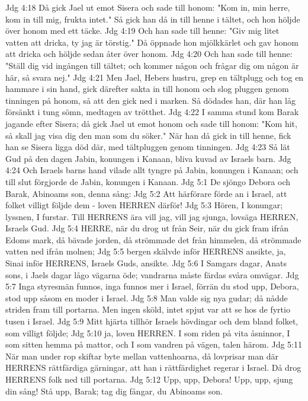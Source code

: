 Jdg 4:18  Då gick Jael ut emot Sisera och sade till honom: "Kom in, min herre, kom in till mig, frukta intet." Så gick han då in till henne i tältet, och hon höljde över honom med ett täcke.
Jdg 4:19  Och han sade till henne: "Giv mig litet vatten att dricka, ty jag är törstig." Då öppnade hon mjölkkärlet och gav honom att dricka och höljde sedan åter över honom.
Jdg 4:20  Och han sade till henne: "Ställ dig vid ingången till tältet; och kommer någon och frågar dig om någon är här, så svara nej."
Jdg 4:21  Men Jael, Hebers hustru, grep en tältplugg och tog en hammare i sin hand, gick därefter sakta in till honom och slog pluggen genom tinningen på honom, så att den gick ned i marken. Så dödades han, där han låg försänkt i tung sömn, medtagen av trötthet.
Jdg 4:22  I samma stund kom Barak jagande efter Sisera; då gick Jael ut emot honom och sade till honom: "Kom hit, så skall jag visa dig den man som du söker." När han då gick in till henne, fick han se Sisera ligga död där, med tältpluggen genom tinningen.
Jdg 4:23  Så lät Gud på den dagen Jabin, konungen i Kanaan, bliva kuvad av Israels barn.
Jdg 4:24  Och Israels barns hand vilade allt tyngre på Jabin, konungen i Kanaan; och till slut förgjorde de Jabin, konungen i Kanaan.
Jdg 5:1  De sjöngo Debora och Barak, Abinoams son, denna sång:
Jdg 5:2  Att härförare förde an i Israel, att folket villigt följde dem - loven HERREN därför!
Jdg 5:3  Hören, I konungar; lyssnen, I furstar. Till HERRENS ära vill jag, vill jag sjunga, lovsäga HERREN, Israels Gud.
Jdg 5:4  HERRE, när du drog ut från Seir, när du gick fram ifrån Edoms mark, då bävade jorden, då strömmade det från himmelen, då strömmade vatten ned ifrån molnen;
Jdg 5:5  bergen skälvde inför HERRENS ansikte, ja, Sinai inför HERRENS, Israels Guds, ansikte.
Jdg 5:6  I Samgars dagar, Anats sons, i Jaels dagar lågo vägarna öde; vandrarna måste färdas svåra omvägar.
Jdg 5:7  Inga styresmän funnos, inga funnos mer i Israel, förrän du stod upp, Debora, stod upp såsom en moder i Israel.
Jdg 5:8  Man valde sig nya gudar; då nådde striden fram till portarna. Men ingen sköld, intet spjut var att se hos de fyrtio tusen i Israel.
Jdg 5:9  Mitt hjärta tillhör Israels hövdingar och dem bland folket, som villigt följde;
Jdg 5:10  ja, loven HERREN. I som riden på vita åsninnor, I som sitten hemma på mattor, och I som vandren på vägen, talen härom.
Jdg 5:11  När man under rop skiftar byte mellan vattenhoarna, då lovprisar man där HERRENS rättfärdiga gärningar, att han i rättfärdighet regerar i Israel. Då drog HERRENS folk ned till portarna.
Jdg 5:12  Upp, upp, Debora! Upp, upp, sjung din sång! Stå upp, Barak; tag dig fångar, du Abinoams son.
